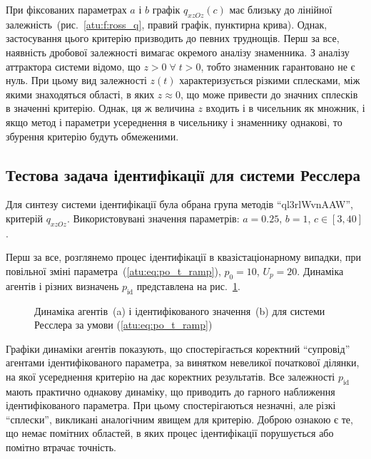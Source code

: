 При фіксованих параметрах
$ a $ і
$ b $ графік
$q_{xzOz}(c)$ має близьку до лінійної залежність~(рис.~\ref{atu:f:ross_q}, правий графік, пунктирна крива).
Однак, застосування цього
критерію призводить до певних труднощів. Перш за все, наявність
дробової залежності вимагає окремого аналізу знаменника. З
аналізу аттрактора системи відомо, що
$ z> 0 \; \forall \; t> 0 $, тобто знаменник гарантовано не є нуль. При цьому
вид залежності
$z(t)$ характеризується різкими сплесками, між якими знаходяться
області, в яких
$ z \approx 0 $, що може привести до значних сплесків в значенні
критерію. Однак, ця ж величина
$z$ входить і в чисельник як множник, і якщо метод і параметри
усереднення в чисельнику і знаменнику однакові, то збурення
критерію будуть обмеженими.



\subsection{Тестова задача ідентифікації для системи Ресслера} %

Для синтезу системи ідентифікації була обрана група методів
``ql3rlWvnAAW'', критерій
$ q_{xzOz} $.
Використовувані значення параметрів:
$ a = 0.25 $,
$ b = 1 $,
$ c \in [3, 40] $.

Перш за все, розглянемо процес ідентифікації
в квазістаціонарному випадки, при повільної зміні
параметра~(\ref{atu:eq:po_t_ramp}),
$ p_0 = 10 $,
$ U_p = 20 $. Динаміка агентів і різних визначень
$ p_\mathrm{id} $ представлена на рис.~\ref{atu:f:ross_id_ramp}.


\begin{figure}[htb!]
  \caption{Динаміка агентів~(a) і ідентифікованого значення~(b) для системи Ресслера за умови (\ref{atu:eq:po_t_ramp})}
  \label{atu:f:ross_id_ramp}
\end{figure}

Графіки динаміки агентів показують, що спостерігається коректний
``супровід'' агентами ідентифікованого параметра, за винятком
невеликої початкової ділянки, на якої усереднення критерію
на дає коректних результатів. Все залежності
$p_\mathrm{id} $ мають практично однакову динаміку,
що приводить до гарного наближення ідентифікованого параметра. При цьому
спостерігаються незначні, але різкі ``сплески'', викликані
аналогічним явищем для критерію. Доброю ознакою є те, що
немає помітних областей, в яких процес ідентифікації
порушується або помітно втрачає точність.

